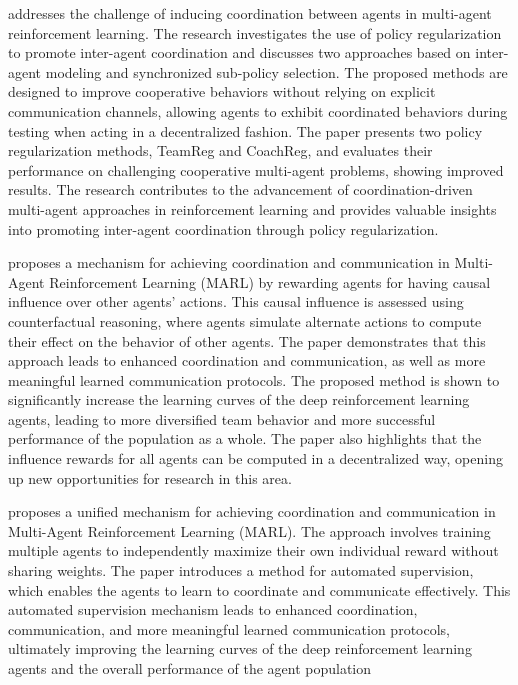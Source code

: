 \documentclass{ecai}
\begin{document}
\citep{Roy2020} addresses the challenge of inducing coordination between agents in multi-agent reinforcement learning. The research investigates the use of policy regularization to promote inter-agent coordination and discusses two approaches based on inter-agent modeling and synchronized sub-policy selection. The proposed methods are designed to improve cooperative behaviors without relying on explicit communication channels, allowing agents to exhibit coordinated behaviors during testing when acting in a decentralized fashion. The paper presents two policy regularization methods, TeamReg and CoachReg, and evaluates their performance on challenging cooperative multi-agent problems, showing improved results. The research contributes to the advancement of coordination-driven multi-agent approaches in reinforcement learning and provides valuable insights into promoting inter-agent coordination through policy regularization.

\citep{Jaques2019} proposes a mechanism for achieving coordination and communication in Multi-Agent Reinforcement Learning (MARL) by rewarding agents for having causal influence over other agents' actions. This causal influence is assessed using counterfactual reasoning, where agents simulate alternate actions to compute their effect on the behavior of other agents. The paper demonstrates that this approach leads to enhanced coordination and communication, as well as more meaningful learned communication protocols. The proposed method is shown to significantly increase the learning curves of the deep reinforcement learning agents, leading to more diversified team behavior and more successful performance of the population as a whole. The paper also highlights that the influence rewards for all agents can be computed in a decentralized way, opening up new opportunities for research in this area.

\citep{Chongjie2008} proposes a unified mechanism for achieving coordination and communication in Multi-Agent Reinforcement Learning (MARL). The approach involves training multiple agents to independently maximize their own individual reward without sharing weights. The paper introduces a method for automated supervision, which enables the agents to learn to coordinate and communicate effectively. This automated supervision mechanism leads to enhanced coordination, communication, and more meaningful learned communication protocols, ultimately improving the learning curves of the deep reinforcement learning agents and the overall performance of the agent population
\end{document}
